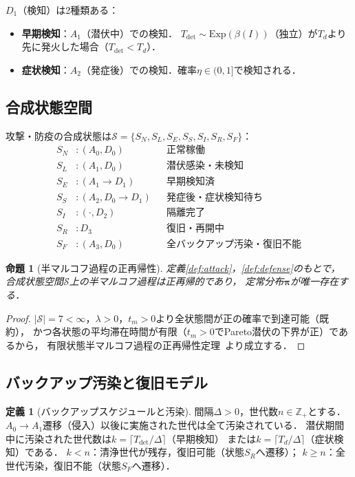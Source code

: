 \documentclass[12pt,a4paper]{article}
\theoremstyle{plain}
\newtheorem{proposition}[theorem]{命題}
\theoremstyle{definition}
\newtheorem{definition}[theorem]{定義}
\theoremstyle{remark}
\newcommand{\Z}{\mathbb{Z}}
\newcommand{\Tdet}{T_{\mathrm{det}}}
\newcommand{\betaI}{\beta(I)}
\begin{document}
$D_1$（検知）は2種類ある：
\begin{itemize}
\item \textbf{早期検知}：$A_1$（潜伏中）での検知．
  $\Tdet\sim\mathrm{Exp}(\betaI)$（独立）が$T_d$より先に発火した場合（$\Tdet<T_d$）．
\item \textbf{症状検知}：$A_2$（発症後）での検知．確率$\eta\in(0,1]$で検知される．
\end{itemize}

\subsection{合成状態空間}

攻撃・防疫の合成状態は$\mathcal S=\{S_N,S_L,S_E,S_S,S_I,S_R,S_F\}$：
\begin{align*}
  S_N &: (A_0,D_0)&& \text{正常稼働}\\
  S_L &: (A_1,D_0)&& \text{潜伏感染・未検知}\\
  S_E &: (A_1\to D_1)&& \text{早期検知済}\\
  S_S &: (A_2,D_0\to D_1)&& \text{発症後・症状検知待ち}\\
  S_I &: (\cdot,D_2)&& \text{隔離完了}\\
  S_R &: D_3&& \text{復旧・再開中}\\
  S_F &: (A_3,D_0)&& \text{全バックアップ汚染・復旧不能}
\end{align*}

\begin{proposition}[半マルコフ過程の正再帰性]\label{prop:stationary}
定義\ref{def:attack}，\ref{def:defense}のもとで，
合成状態空間$\mathcal S$上の半マルコフ過程は正再帰的であり，
定常分布$\bm\pi$が唯一存在する．
\end{proposition}

\begin{proof}
$|\mathcal S|=7<\infty$，$\lambda>0$，$t_m>0$より全状態間が正の確率で到達可能（既約），
かつ各状態の平均滞在時間が有限（$t_m>0$でPareto潜伏の下界が正）であるから，
有限状態半マルコフ過程の正再帰性定理~\cite{limnios2001}より成立する．
\end{proof}

\subsection{バックアップ汚染と復旧モデル}

\begin{definition}[バックアップスケジュールと汚染]
\label{def:backup}
間隔$\Delta>0$，世代数$n\in\Z_+$とする．
$A_0\to A_1$遷移（侵入）以後に実施された世代は全て汚染されている．
潜伏期間中に汚染された世代数は$k=\lceil\Tdet/\Delta\rceil$（早期検知）
または$k=\lceil T_d/\Delta\rceil$（症状検知）である．
$k<n$：清浄世代が残存，復旧可能（状態$S_R$へ遷移）；
$k\ge n$：全世代汚染，復旧不能（状態$S_F$へ遷移）．
\end{definition}
\end{document}
